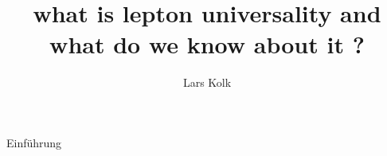 \documentclass[aspectratio=1610, 9pt]{beamer}
\title{what is lepton universality and what do we know about it ?}
\author[L.~Kolk]{Lars Kolk}
\institute[Fakultät Physik]{Fakultät Physik}
\begin{document}
\maketitle


\begin{frame}{Einführung}
  \tableofcontents
\end{frame}






\end{document}

